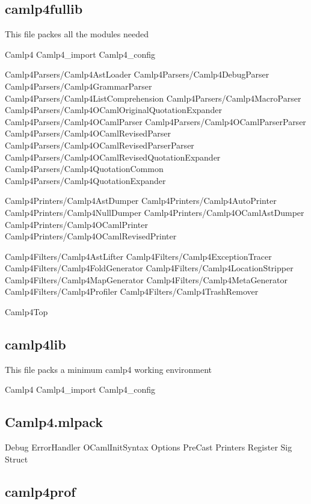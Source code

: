 \subsection{camlp4fullib}
\label{camlp4fullib}
This file packes all the modules needed 


\begin{bashcode}
Camlp4
Camlp4_import
Camlp4_config

Camlp4Parsers/Camlp4AstLoader
Camlp4Parsers/Camlp4DebugParser
Camlp4Parsers/Camlp4GrammarParser
Camlp4Parsers/Camlp4ListComprehension
Camlp4Parsers/Camlp4MacroParser
Camlp4Parsers/Camlp4OCamlOriginalQuotationExpander
Camlp4Parsers/Camlp4OCamlParser
Camlp4Parsers/Camlp4OCamlParserParser
Camlp4Parsers/Camlp4OCamlRevisedParser
Camlp4Parsers/Camlp4OCamlRevisedParserParser
Camlp4Parsers/Camlp4OCamlRevisedQuotationExpander
Camlp4Parsers/Camlp4QuotationCommon
Camlp4Parsers/Camlp4QuotationExpander

Camlp4Printers/Camlp4AstDumper
Camlp4Printers/Camlp4AutoPrinter
Camlp4Printers/Camlp4NullDumper
Camlp4Printers/Camlp4OCamlAstDumper
Camlp4Printers/Camlp4OCamlPrinter
Camlp4Printers/Camlp4OCamlRevisedPrinter

Camlp4Filters/Camlp4AstLifter
Camlp4Filters/Camlp4ExceptionTracer
Camlp4Filters/Camlp4FoldGenerator
Camlp4Filters/Camlp4LocationStripper
Camlp4Filters/Camlp4MapGenerator
Camlp4Filters/Camlp4MetaGenerator
Camlp4Filters/Camlp4Profiler
Camlp4Filters/Camlp4TrashRemover

Camlp4Top
\end{bashcode}


\subsection{camlp4lib}
\label{camlp4lib}
This file packs a minimum camlp4 working environment

\begin{bashcode}
Camlp4
Camlp4_import
Camlp4_config
\end{bashcode}

\subsection{Camlp4.mlpack}
\label{Camlp4.mlpack}

\begin{bashcode}
Debug
ErrorHandler
OCamlInitSyntax
Options
PreCast
Printers
Register
Sig
Struct
\end{bashcode}

\subsection{camlp4prof}
\label{sec:camlp4prof}

